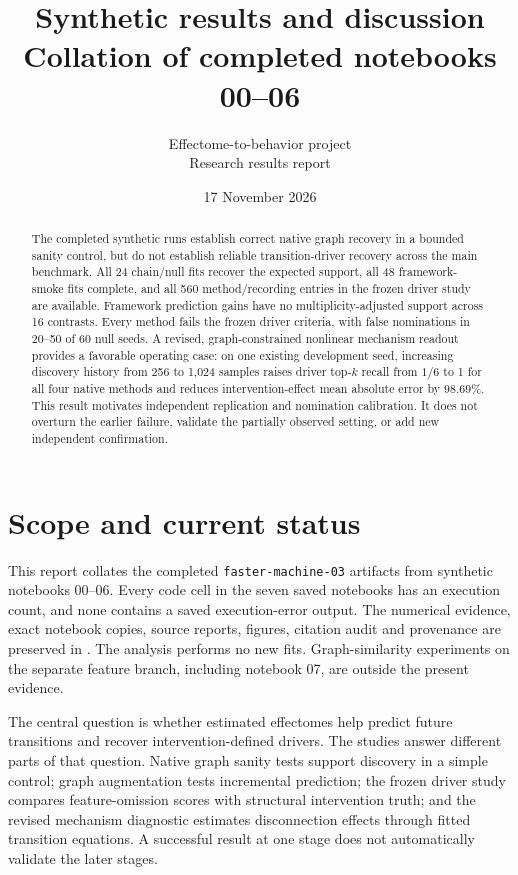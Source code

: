 \documentclass[11pt,a4paper]{article}
\title{Synthetic results and discussion\\
  \large Collation of completed notebooks 00--06}
\author{Effectome-to-behavior project\\\small Research results report}
\date{17 November 2026}
\begin{document}
\maketitle

\begin{abstract}
The completed synthetic runs establish correct native graph recovery in a bounded
sanity control, but do not establish reliable transition-driver recovery across
the main benchmark. All 24 chain/null fits recover the expected support, all 48
framework-smoke fits complete, and all 560 method/recording entries in the frozen
driver study are available. Framework prediction gains have no multiplicity-adjusted
support across 16 contrasts. Every method fails the frozen driver criteria, with
false nominations in 20--50 of 60 null seeds. A revised, graph-constrained nonlinear
mechanism readout provides a favorable operating case: on one existing development
seed, increasing discovery history from 256 to 1,024 samples raises driver top-$k$
recall from $1/6$ to 1 for all four native methods and reduces intervention-effect
mean absolute error by 98.69\%. This result motivates independent replication and
nomination calibration. It does not overturn the earlier failure, validate the
partially observed setting, or add new independent confirmation.
\end{abstract}

\tableofcontents

\section{Scope and current status}
\label{sec:scope}

This report collates the completed \texttt{faster-machine-03} artifacts from
synthetic notebooks 00--06. Every code cell in the seven saved notebooks has an
execution count, and none contains a saved execution-error output. The numerical
evidence, exact notebook copies, source reports, figures, citation audit and
provenance are preserved in .
The analysis performs no new fits. Graph-similarity experiments on the separate
feature branch, including notebook 07, are outside the present evidence.

The central question is whether estimated effectomes help predict future
transitions and recover intervention-defined drivers. The studies answer different
parts of that question. Native graph sanity tests support discovery in a simple
control; graph augmentation tests incremental prediction; the frozen driver study
compares feature-omission scores with structural intervention truth; and the revised
mechanism diagnostic estimates disconnection effects through fitted transition
equations. A successful result at one stage does not automatically validate the
later stages.
\end{document}
